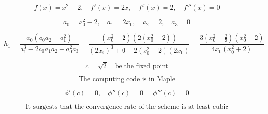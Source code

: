 \documentclass[12pt]{article}
\begin{document}
\[
f(x) = x^2 - 2, \quad f'(x) = 2x, \quad f''(x) = 2, \quad f'''(x) = 0
\]

\[
a_0 = x_0^2 - 2, \quad a_1 = 2x_0, \quad a_2 = 2, \quad a_3 = 0
\]

\[
h_1 = \frac{a_0 (a_0 a_2 - a_1^2)}{a_1^3 - 2 a_0 a_1 a_2 + a_0^2 a_3}
= \frac{(x_0^2 - 2)(2(x_0^2 - 2))}{(2x_0)^3 + 0 - 2(x_0^2 - 2)(2x_0)} 
= \frac{3(x_0^2 + \frac{2}{3})(x_0^2 - 2)}{4 x_0 (x_0^2 + 2)}
\]

\[
c = \sqrt{2} \quad \text{be the fixed point}
\]

\[
\text{The computing code is in Maple}
\]

\[
\phi'(c) = 0, \quad \phi''(c) = 0, \quad \phi'''(c) = 0
\]

\[
\text{It suggests that the convergence rate of the scheme is at least cubic}
\]





\end{document}
